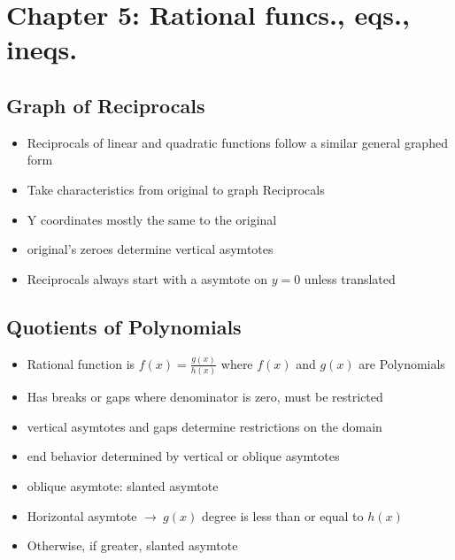 \documentclass{article}
\newcommand{\rt}{$\to\ $}
\begin{document}
    \section{Chapter 5: Rational funcs., eqs., ineqs.}
    
    \subsection{Graph of Reciprocals}
    \begin{itemize}
        \item Reciprocals of linear and quadratic functions follow a similar general graphed form 
        \item Take characteristics from original to graph Reciprocals
        \item Y coordinates mostly the same to the original
        \item original's zeroes determine vertical asymtotes
        \item Reciprocals always start with a asymtote on $y=0$ unless translated
    \end{itemize}

    \subsection{Quotients of Polynomials}
    \begin{itemize}
        \item Rational function is $f(x) = \frac{g(x)}{h(x)}$ where $f(x)$ and $g(x)$ are Polynomials
        \item Has breaks or gaps where denominator is zero, must be restricted
        \item vertical asymtotes and gaps determine restrictions on the domain
        \item end behavior determined by vertical or oblique asymtotes
        \item oblique asymtote: slanted asymtote
        \item Horizontal asymtote \rt $g(x)$ degree is less than or equal to $h(x)$
        \item Otherwise, if greater, slanted asymtote
    \end{itemize}
\end{document}
